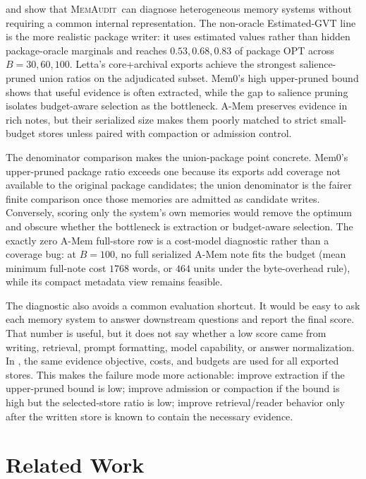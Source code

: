 \documentclass{article}
\theoremstyle{remark}
\theoremstyle{plain}
\newcommand{\method}{\textsc{MemAudit}}
\begin{document}
 and  show that \method\ can diagnose heterogeneous memory systems without requiring a common internal representation. The non-oracle Estimated-GVT line is the more realistic package writer: it uses estimated values rather than hidden package-oracle marginals and reaches $0.53,0.68,0.83$ of package OPT across $B=30,60,100$. Letta's core+archival exports achieve the strongest salience-pruned union ratios on the adjudicated subset. Mem0's high upper-pruned bound shows that useful evidence is often extracted, while the gap to salience pruning isolates budget-aware selection as the bottleneck. A-Mem preserves evidence in rich notes, but their serialized size makes them poorly matched to strict small-budget stores unless paired with compaction or admission control.

The denominator comparison makes the union-package point concrete. Mem0's upper-pruned package ratio exceeds one because its exports add coverage not available to the original package candidates; the union denominator is the fairer finite comparison once those memories are admitted as candidate writes. Conversely, scoring only the system's own memories would remove the optimum and obscure whether the bottleneck is extraction or budget-aware selection. The exactly zero A-Mem full-store row is a cost-model diagnostic rather than a coverage bug: at $B=100$, no full serialized A-Mem note fits the budget (mean minimum full-note cost $1768$ words, or $464$ units under the byte-overhead rule), while its compact metadata view remains feasible.

The diagnostic also avoids a common evaluation shortcut. It would be easy to ask each memory system to answer downstream questions and report the final score. That number is useful, but it does not say whether a low score came from writing, retrieval, prompt formatting, model capability, or answer normalization. In , the same evidence objective, costs, and budgets are used for all exported stores. This makes the failure mode more actionable: improve extraction if the upper-pruned bound is low; improve admission or compaction if the bound is high but the selected-store ratio is low; improve retrieval/reader behavior only after the written store is known to contain the necessary evidence.

\section{Related Work}\label{sec:related}
\end{document}
